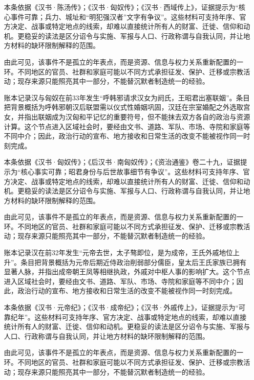 本条依据《汉书·陈汤传》；《汉书·匈奴传》；《汉书·西域传上》，证据提示为“核心事件可靠；兵力、城址和“明犯强汉者”文字有争议”。这些材料可支持年序、官方决定、战事或特定地点的线索，却难以直接统计所有人的财富、迁徙、信仰和动机。更稳妥的读法是区分诏令与实施、军报与人口、行政称谓与自我认同，并让地方材料的缺环限制解释的范围。

由此可见，该事件不是孤立的年表点，而是资源、信息与权力关系重新配置的一环。不同地区的官员、社群和家庭可能以不同方式承担征发、保护、迁移或宗教活动；现存来源只能照亮其中一部分，不能替沉默者制造统一的经验。

账本记录汉与匈奴在前33年发生“呼韩邪请求汉女为阏氏，王昭君出塞联姻”。条目把背景概括为呼韩邪朝汉后联盟需以仪式性婚姻巩固，汉廷在宗室婚配之外选取宫女，并指出联姻成为汉匈和平记忆的重要符号，但不能抹去双方各自的政治与资源计算。这个节点进入区域社会时，要经由文书、道路、军队、市场、寺院和家庭等不同中介；因此，政治行动的宣布、地方接收和日常生活的改变不能被视作同一时刻完成。

本条依据《汉书·匈奴传》；《后汉书·南匈奴传》；《资治通鉴》卷二十九，证据提示为“核心事实可靠；昭君身份与后世故事细节有争议”。这些材料可支持年序、官方决定、战事或特定地点的线索，却难以直接统计所有人的财富、迁徙、信仰和动机。更稳妥的读法是区分诏令与实施、军报与人口、行政称谓与自我认同，并让地方材料的缺环限制解释的范围。

由此可见，该事件不是孤立的年表点，而是资源、信息与权力关系重新配置的一环。不同地区的官员、社群和家庭可能以不同方式承担征发、保护、迁移或宗教活动；现存来源只能照亮其中一部分，不能替沉默者制造统一的经验。

账本记录汉在前32年发生“元帝去世，太子骜即位，是为成帝，王氏外戚地位上升”。条目把背景概括为元帝后期近侍政治削弱部分儒臣，皇太后王氏家族已拥有显著人脉，并指出成帝朝王凤等相继执政，外戚对中枢人事的影响扩大。这个节点进入区域社会时，要经由文书、道路、军队、市场、寺院和家庭等不同中介；因此，政治行动的宣布、地方接收和日常生活的改变不能被视作同一时刻完成。

本条依据《汉书·元帝纪》；《汉书·成帝纪》；《汉书·外戚传上》，证据提示为“可靠纪年”。这些材料可支持年序、官方决定、战事或特定地点的线索，却难以直接统计所有人的财富、迁徙、信仰和动机。更稳妥的读法是区分诏令与实施、军报与人口、行政称谓与自我认同，并让地方材料的缺环限制解释的范围。

由此可见，该事件不是孤立的年表点，而是资源、信息与权力关系重新配置的一环。不同地区的官员、社群和家庭可能以不同方式承担征发、保护、迁移或宗教活动；现存来源只能照亮其中一部分，不能替沉默者制造统一的经验。

